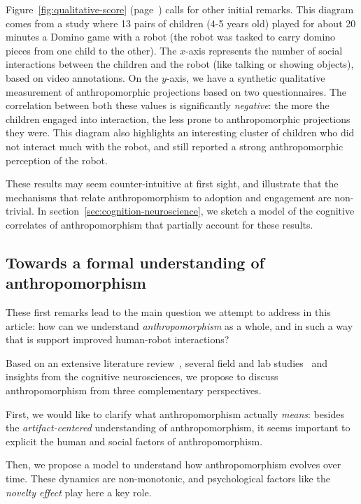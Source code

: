 \documentclass{frontiersSCNS} %
\begin{document}
Figure~\ref{fig:qualitative-score} (page~\pageref{fig:qualitative-score}) calls
for other initial remarks. This diagram comes from a study where 13 pairs of
children (4-5 years old) played for about 20 minutes a Domino game with a robot
(the robot was tasked to carry domino pieces from one child to the other). The
$x$-axis represents the number of social interactions between the children and
the robot (like talking or showing objects), based on video annotations. On the
$y$-axis, we have a synthetic qualitative measurement of anthropomorphic
projections based on two questionnaires. The correlation between both these
values is significantly \emph{negative}: the more the children engaged into
interaction, the less prone to anthropomorphic projections they were. This
diagram also highlights an interesting cluster of children who did not interact
much with the robot, and still reported a strong anthropomorphic perception of
the robot.

These results may seem counter-intuitive at first sight, and illustrate that the
mechanisms that relate anthropomorphism to adoption and engagement are
non-trivial. In section~\ref{sec:cognition-neuroscience}, we sketch a model of
the cognitive correlates of anthropomorphism that partially account for these
results.

\subsection{Towards a formal understanding of anthropomorphism}

These first remarks lead to the main question we attempt to address in this
article: how can we understand \emph{anthropomorphism} as a whole, and in such a
way that is support improved human-robot interactions?


Based on an extensive literature review~\citep{fink_anthropomorphism_2012},
several field and lab studies~\citep{ fink_anthropomorphic_2012,
fink_living_2013, fink2014which, lemaignan2014dynamics} and insights from the
cognitive neurosciences, we propose to discuss anthropomorphism from three
complementary perspectives.

First, we would like to clarify what anthropomorphism actually \emph{means}:
besides the \emph{artifact-centered} understanding of anthropomorphism, it
seems important to explicit the human and social factors of anthropomorphism.

Then, we propose a model to understand how anthropomorphism evolves over time.
These dynamics are non-monotonic, and psychological factors like the
\emph{novelty effect} play here a key role.
\end{document}
